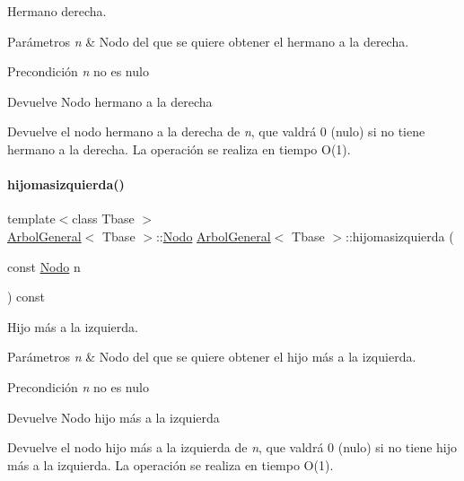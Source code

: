 Hermano derecha. 


\begin{DoxyParams}{Parámetros}
{\em n} & Nodo del que se quiere obtener el hermano a la derecha. \\
\hline
\end{DoxyParams}
\begin{DoxyPrecond}{Precondición}
{\itshape n} no es nulo 
\end{DoxyPrecond}
\begin{DoxyReturn}{Devuelve}
Nodo hermano a la derecha
\end{DoxyReturn}
Devuelve el nodo hermano a la derecha de {\itshape n}, que valdrá 0 (nulo) si no tiene hermano a la derecha. La operación se realiza en tiempo O(1). \hypertarget{classArbolGeneral_aa0b433b9afe680fbdf84f72493f92f68}{}\label{classArbolGeneral_aa0b433b9afe680fbdf84f72493f92f68} 
\paragraph{\texorpdfstring{hijomasizquierda()}{hijomasizquierda()}}
{\footnotesize\ttfamily template$<$class Tbase $>$ \\
\hyperlink{classArbolGeneral}{Arbol\+General}$<$ Tbase $>$\+::\hyperlink{classArbolGeneral_a12cc1b74a9095d89bc7334290d332f7a}{Nodo} \hyperlink{classArbolGeneral}{Arbol\+General}$<$ Tbase $>$\+::hijomasizquierda (\begin{DoxyParamCaption}\item[{const \hyperlink{classArbolGeneral_a12cc1b74a9095d89bc7334290d332f7a}{Nodo}}]{n }\end{DoxyParamCaption}) const}



Hijo más a la izquierda. 


\begin{DoxyParams}{Parámetros}
{\em n} & Nodo del que se quiere obtener el hijo más a la izquierda. \\
\hline
\end{DoxyParams}
\begin{DoxyPrecond}{Precondición}
{\itshape n} no es nulo 
\end{DoxyPrecond}
\begin{DoxyReturn}{Devuelve}
Nodo hijo más a la izquierda
\end{DoxyReturn}
Devuelve el nodo hijo más a la izquierda de {\itshape n}, que valdrá 0 (nulo) si no tiene hijo más a la izquierda. La operación se realiza en tiempo O(1). \hypertarget{classArbolGeneral_a855d44f14a9ef638f8dd46376fc2f961}{}\label{classArbolGeneral_a855d44f14a9ef638f8dd46376fc2f961} 

